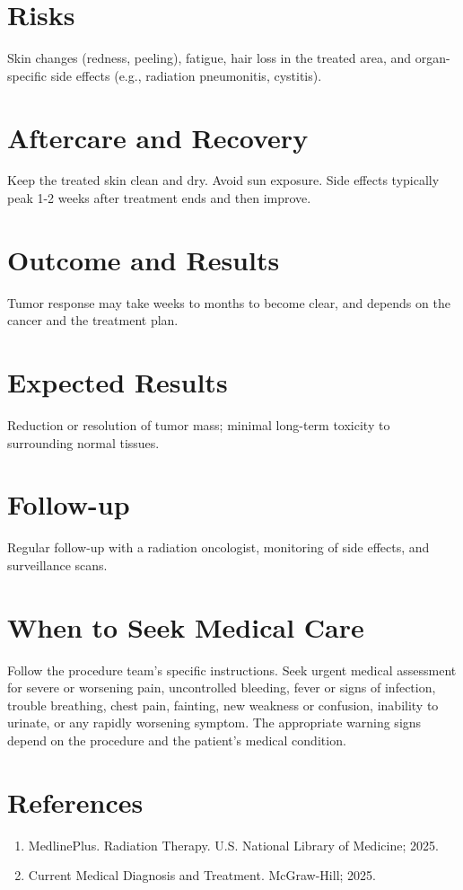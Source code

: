 \section*{Risks}
Skin changes (redness, peeling), fatigue, hair loss in the treated area, and organ-specific side effects (e.g., radiation pneumonitis, cystitis).

\section*{Aftercare and Recovery}
Keep the treated skin clean and dry. Avoid sun exposure. Side effects typically peak 1-2 weeks after treatment ends and then improve.

\section*{Outcome and Results}
Tumor response may take weeks to months to become clear, and depends on the cancer and the treatment plan.

\section*{Expected Results}
Reduction or resolution of tumor mass; minimal long-term toxicity to surrounding normal tissues.

\section*{Follow-up}
Regular follow-up with a radiation oncologist, monitoring of side effects, and surveillance scans.

\section*{When to Seek Medical Care}
Follow the procedure team's specific instructions. Seek urgent medical assessment for severe or worsening pain, uncontrolled bleeding, fever or signs of infection, trouble breathing, chest pain, fainting, new weakness or confusion, inability to urinate, or any rapidly worsening symptom. The appropriate warning signs depend on the procedure and the patient's medical condition.

\section*{References}
\begin{enumerate}
  \item MedlinePlus. Radiation Therapy. U.S. National Library of Medicine; 2025.
  \item Current Medical Diagnosis and Treatment. McGraw-Hill; 2025.
\end{enumerate}

\clearpage
